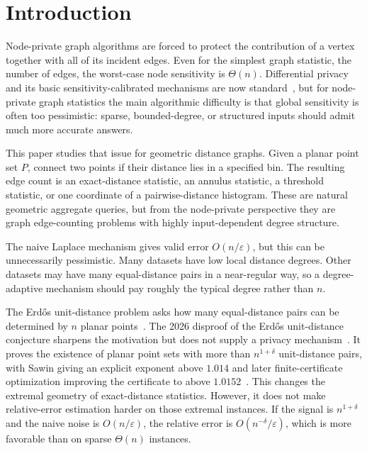 \documentclass[11pt]{article}
\newcommand{\eps}{\varepsilon}
\begin{document}
\section{Introduction}

Node-private graph algorithms are forced to protect the contribution of a vertex together with all of its incident edges. Even for the simplest graph statistic, the number of edges, the worst-case node sensitivity is \(\Theta(n)\). Differential privacy and its basic sensitivity-calibrated mechanisms are now standard~\cite{DMNS06,DworkRoth14}, but for node-private graph statistics the main algorithmic difficulty is that global sensitivity is often too pessimistic: sparse, bounded-degree, or structured inputs should admit much more accurate answers.

This paper studies that issue for geometric distance graphs. Given a planar point set \(P\), connect two points if their distance lies in a specified bin. The resulting edge count is an exact-distance statistic, an annulus statistic, a threshold statistic, or one coordinate of a pairwise-distance histogram. These are natural geometric aggregate queries, but from the node-private perspective they are graph edge-counting problems with highly input-dependent degree structure.

The naive Laplace mechanism gives valid error \(O(n/\eps)\), but this can be unnecessarily pessimistic. Many datasets have low local distance degrees. Other datasets may have many equal-distance pairs in a near-regular way, so a degree-adaptive mechanism should pay roughly the typical degree rather than \(n\).

The Erd\H{o}s unit-distance problem asks how many equal-distance pairs can be determined by \(n\) planar points~\cite{Erdos46,BrassMoserPach05}. The 2026 disproof of the Erd\H{o}s unit-distance conjecture sharpens the motivation but does not supply a privacy mechanism~\cite{OpenAI2026,Remarks2026}. It proves the existence of planar point sets with more than \(n^{1+\delta}\) unit-distance pairs, with Sawin giving an explicit exponent above \(1.014\) and later finite-certificate optimization improving the certificate to above \(1.0152\)~\cite{Sawin2026,Emmerich2026}. This changes the extremal geometry of exact-distance statistics. However, it does not make relative-error estimation harder on those extremal instances. If the signal is \(n^{1+\delta}\) and the naive noise is \(O(n/\eps)\), the relative error is \(O(n^{-\delta}/\eps)\), which is more favorable than on sparse \(\Theta(n)\) instances.
\end{document}
